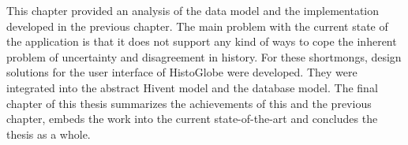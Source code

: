 



\vspace{2em}

This chapter provided an analysis of the data model and the implementation developed in the previous chapter. The main problem with the current state of the application is that it does not support any kind of ways to cope the inherent problem of uncertainty and disagreement in history. For these shortmongs, design solutions for the user interface of HistoGlobe were developed. They were integrated into the abstract Hivent model and the database model. The final chapter of this thesis summarizes the achievements of this and the previous chapter, embeds the work into the current state-of-the-art and concludes the thesis as a whole.